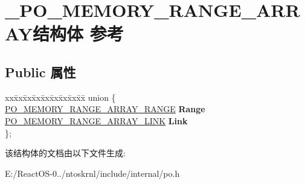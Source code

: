 \hypertarget{struct___p_o___m_e_m_o_r_y___r_a_n_g_e___a_r_r_a_y}{}\section{\+\_\+\+P\+O\+\_\+\+M\+E\+M\+O\+R\+Y\+\_\+\+R\+A\+N\+G\+E\+\_\+\+A\+R\+R\+A\+Y结构体 参考}
\label{struct___p_o___m_e_m_o_r_y___r_a_n_g_e___a_r_r_a_y}
\subsection*{Public 属性}
\begin{DoxyCompactItemize}
\item 
\mbox{\label{struct___p_o___m_e_m_o_r_y___r_a_n_g_e___a_r_r_a_y_aabbc5f3e8d6c80f94543f44883f2d45f}} 
\begin{tabbing}
xx\=xx\=xx\=xx\=xx\=xx\=xx\=xx\=xx\=\kill
union \{\\
\>\hyperlink{struct___p_o___m_e_m_o_r_y___r_a_n_g_e___a_r_r_a_y___r_a_n_g_e}{PO\_MEMORY\_RANGE\_ARRAY\_RANGE} {\bfseries Range}\\
\>\hyperlink{struct___p_o___m_e_m_o_r_y___r_a_n_g_e___a_r_r_a_y___l_i_n_k}{PO\_MEMORY\_RANGE\_ARRAY\_LINK} {\bfseries Link}\\
\}; \\

\end{tabbing}\end{DoxyCompactItemize}


该结构体的文档由以下文件生成\+:\begin{DoxyCompactItemize}
\item 
E\+:/\+React\+O\+S-\/0../ntoskrnl/include/internal/po.\+h\end{DoxyCompactItemize}
